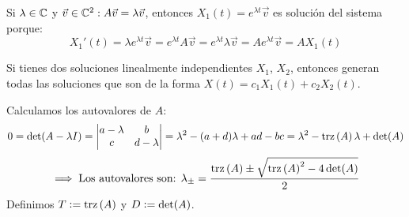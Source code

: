 Si $\lambda \in \mathbb{C}$ y $\vec{v} \in \mathbb{C}^2 : A\vec{v} = \lambda \vec{v}$, entonces $X_1(t) = e^{\lambda t} \vec{v}$ es solución del sistema porque:
\[X_1'(t) = \lambda e^{\lambda t} \vec{v} = e^{\lambda t} A\vec{v} = e^{\lambda t} \lambda \vec{v} = A e^{\lambda t} \vec{v} = A X_1(t)\]

Si tienes dos soluciones linealmente independientes $X_1$, $X_2$, entonces generan todas las soluciones que son de la forma $X(t) = c_1 X_1(t) + c_2 X_2(t)$.

Calculamos los autovalores de $A$:
\[0= \det (A - \lambda I) = \begin{vmatrix}
		a-\lambda & b         \\
		c         & d-\lambda
	\end{vmatrix} = \lambda^2 - (a+d)\lambda + ad - bc = \lambda^2 - \operatorname{trz}\left(A\right) \lambda + \det(A)\]
\[\implies \text{Los autovalores son: } \lambda_{\pm} = \frac{\operatorname{trz}\left(A\right) \pm \sqrt{\operatorname{trz}\left(A\right)^2 - 4\det(A)}}{2}\]
Definimos $T\vcentcolon= \operatorname{trz}\left(A\right)$ y $D\vcentcolon= \det(A)$. %
